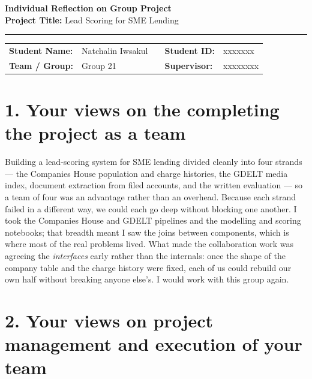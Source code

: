 \documentclass[11pt, a4paper]{article}
\begin{document}
\begin{center}
    {\Large \bfseries Individual Reflection on Group Project} \\[0.3em]
    {\small \textbf{Project Title:} Lead Scoring for SME Lending} \\[0.2em]
    \rule{\textwidth}{1pt}
\end{center}

\vspace{-0.5em}
\noindent
\begin{tabular}{@{}ll p{0.5em} ll@{}}
    \textbf{Student Name:} & Natchalin Iwsakul & & \textbf{Student ID:} & xxxxxxx \\
    \textbf{Team / Group:} & Group 21 & & \textbf{Supervisor:} & xxxxxxxx \\
\end{tabular}

\vspace{0.2em}

\section*{1. Your views on the completing the project as a team}

Building a lead-scoring system for SME lending divided cleanly into four strands --- the
Companies House population and charge histories, the GDELT media index, document extraction
from filed accounts, and the written evaluation --- so a team of four was an advantage rather
than an overhead. Because each strand failed in a different way, we could each go deep
without blocking one another. I took the Companies House and GDELT pipelines and the
modelling and scoring notebooks; that breadth meant I saw the joins between components, which
is where most of the real problems lived. What made the collaboration work was agreeing the
\emph{interfaces} early rather than the internals: once the shape of the company table and
the charge history were fixed, each of us could rebuild our own half without breaking anyone
else's. I would work with this group again.

\section*{2. Your views on project management and execution of your team}
\end{document}

